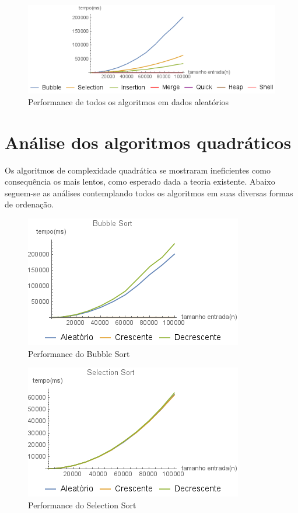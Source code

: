 \documentclass[a4paper, 12pt]{report}
\begin{document}
\begin{figure}[htb]
\centering
\includegraphics[width=.9\linewidth]{./img/all_random.png}
\caption{\small Performance de todos os  algoritmos em dados aleatórios}
\end{figure}

\chapter{Análise dos algoritmos quadráticos}
\label{sec-4-1}
Os algoritmos de complexidade quadrática se mostraram ineficientes como
consequência os mais lentos, como esperado dada a teoria existente. Abaixo
seguem-se as análises contemplando todos os algoritmos em suas diversas formas
de ordenação.

\begin{figure}[htb]
\centering
\includegraphics[width=.9\linewidth]{./img/bubble_all.png}
\caption{Performance do Bubble Sort}
\end{figure}

\begin{figure}[htb]
\centering
\includegraphics[width=.9\linewidth]{./img/selection_all.png}
\caption{Performance do Selection Sort}
\end{figure}
\end{document}
